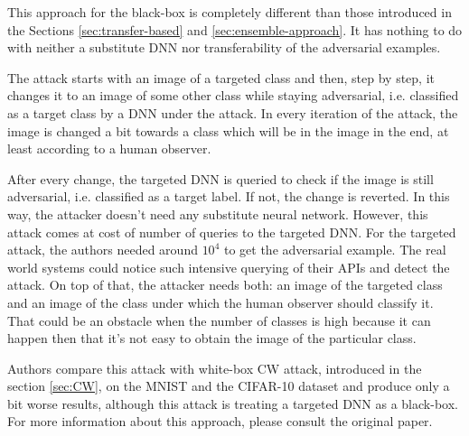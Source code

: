 This approach for the black-box is completely different than those introduced in the Sections \ref{sec:transfer-based} and \ref{sec:ensemble-approach}. It has nothing to do with neither a substitute DNN nor transferability of the adversarial examples. 

The attack starts with an image of a targeted class and then, step by step, it changes it to an image of some other class while staying adversarial, i.e. classified as a target class by a DNN under the attack. In every iteration of the attack, the image is changed a bit towards a class which will be in the image in the end, at least according to a human observer. 

After every change, the targeted DNN is queried to check if the image is still adversarial, i.e. classified as a target label. If not, the change is reverted. In this way, the attacker doesn't need any substitute neural network. However, this attack comes at cost of number of queries to the targeted DNN. For the targeted attack, the authors needed around $10^4$ to get the adversarial example. The real world systems could notice such intensive querying of their APIs and detect the attack. On top of that, the attacker needs both: an image of the targeted class and an image of the class under which the human observer should classify it. That could be an obstacle when the number of classes is high because it can happen then that it's not easy to obtain the image of the particular class.

Authors compare this attack with white-box CW attack, introduced in the section \ref{sec:CW}, on the MNIST and the CIFAR-10 dataset and produce only a bit worse results, although this attack is treating a targeted DNN as a black-box.  For more information about this approach, please consult the original paper\cite{brendel2018decisionbased}.
